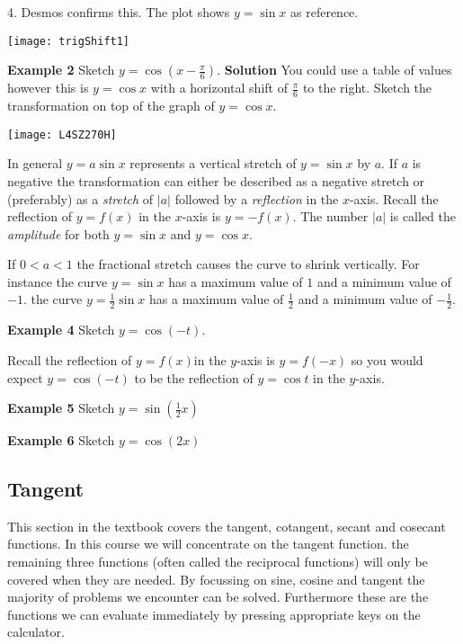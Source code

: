 4. Desmos confirms this. The plot shows $y=\sin x$ as reference.\\
\begin{center}
\texttt{[image: trigShift1]}
\end{center}


\textbf{Example 2} Sketch $y =\cos  (x -\frac{\pi }{6})$.
\textbf{Solution} You could use a table of values however this is $y =\cos  x$ with a horizontal shift of $\frac{\pi }{6}$ to the right. Sketch the transformation on top of the graph of $y =\cos  x $.
\begin{center}
\texttt{[image: L4SZ270H]}
\end{center}

In general $y =a \sin  x$ represents a vertical stretch of $y =\sin  x$ by $a$. If $a$ is negative the transformation can either be described as a negative stretch or (preferably) as a \emph{stretch}
of $\left \vert a\right \vert $ followed by a \emph{reflection} in the $x$-axis. Recall the reflection of $y =f \left (x\right )$ in the $x$-axis is $y = -f \left (x\right )$. The number $\left \vert a\right \vert $ is called the \emph{amplitude} for both $y =\sin  x$ and $y =\cos  x\text{.}$ 

If $0 <a <1$ the fractional stretch causes the curve to shrink vertically. For instance the curve
$y =\sin  x$ has a maximum value of $1$ and a minimum value of $ -1$. the curve $y =\frac{1}{2} \sin  x$ has a maximum value of $\frac{1}{2}$ and a minimum value of $ -\frac{1}{2}$. 

\textbf{Example 4} Sketch $y =\cos  ( -t)\text{.}$ 

Recall the reflection of $y =f (x)$in the $y$-axis is $y =f ( -x)$ so you would expect $y =\cos  ( -t)$ to be the reflection of $y =\cos  t$ in the $y$-axis. 


\textbf{Example 5} Sketch $y =\sin \left( \frac{1}{2}x\right)$ 


\textbf{Example 6} Sketch $y =\cos(2x)$ 




\subsection{Tangent}
This section in the textbook covers the tangent, cotangent, secant and cosecant functions. In this course we will concentrate on the tangent function. the remaining three functions (often called the reciprocal functions) will only be covered when they are needed. By focussing on sine, cosine and tangent the majority of problems we encounter can be solved. Furthermore these are the functions we can evaluate immediately by pressing appropriate keys on the calculator. 

